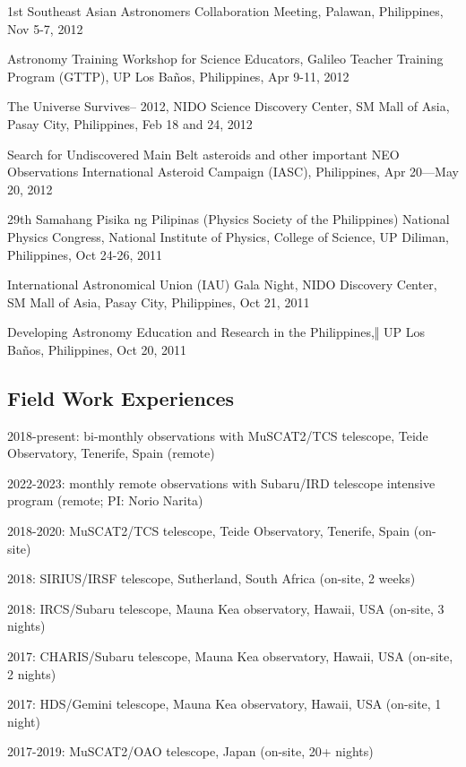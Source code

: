\documentclass[12pt,letterpaper]{article}
\begin{document}
\begin{list}{}{\cvlist}
    \item 1st Southeast Asian Astronomers Collaboration Meeting, Palawan, Philippines, Nov 5-7, 2012
    \item Astronomy Training Workshop for Science Educators, Galileo Teacher Training Program (GTTP), UP Los Baños, Philippines, Apr 9-11, 2012
    \item The Universe Survives– 2012, NIDO Science Discovery Center, SM Mall of Asia, Pasay City, Philippines, Feb 18 and 24, 2012
    \item Search for Undiscovered Main Belt asteroids and other important NEO Observations International Asteroid Campaign (IASC), Philippines, Apr 20—May 20, 2012
    \item 29th Samahang Pisika ng Pilipinas (Physics Society of the Philippines) National Physics Congress, National Institute of Physics, College of Science, UP Diliman, Philippines, Oct 24-26, 2011
    \item International Astronomical Union (IAU) Gala Night, NIDO Discovery Center, SM Mall of Asia, Pasay City, Philippines, Oct 21, 2011
    \item Developing Astronomy Education and Research in the Philippines,‖ UP Los Baños, Philippines, Oct 20, 2011
\end{list}

\subsection{Field Work Experiences}
\begin{list}{}{\cvlist}
    \item 2018-present: bi-monthly observations with MuSCAT2/TCS telescope, Teide Observatory, Tenerife, Spain (remote)
    \item 2022-2023: monthly remote observations with Subaru/IRD telescope intensive program (remote; PI: Norio Narita)
    \item 2018-2020: MuSCAT2/TCS telescope, Teide Observatory, Tenerife, Spain (on-site) 
    \item 2018: SIRIUS/IRSF telescope, Sutherland, South Africa (on-site, 2 weeks)
    \item 2018: IRCS/Subaru telescope, Mauna Kea observatory, Hawaii, USA (on-site, 3 nights)
    \item 2017: CHARIS/Subaru telescope, Mauna Kea observatory, Hawaii, USA (on-site, 2 nights)
    \item 2017: HDS/Gemini telescope, Mauna Kea observatory, Hawaii, USA (on-site, 1 night)
    \item 2017-2019: MuSCAT2/OAO telescope, Japan (on-site, 20+ nights)
\end{list}
\end{document}
